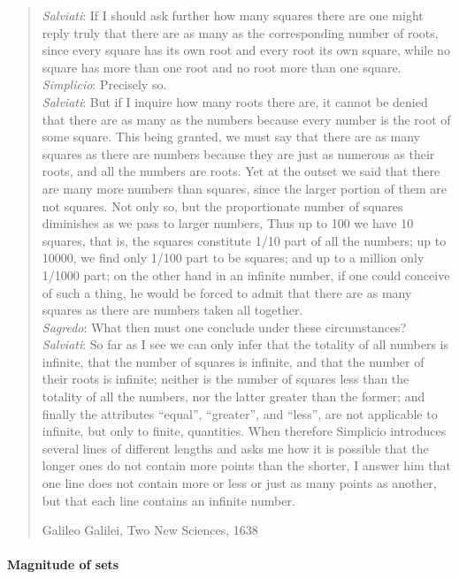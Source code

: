 \begin{quote}
	\textit{Salviati}: If I should ask further how many squares there are one might reply truly that there are as many as the corresponding number of roots, since every square has its own root and every root its own square, while no square has more than one root and no root more than one square.\\
	\textit{Simplicio}: Precisely so.\\
	\textit{Salviati}: But if I inquire how many roots there are, it cannot be denied that there are as many as the numbers because every number is the root of some square. This being granted, we must say that there are as many squares as there are numbers because they are just as numerous as their roots, and all the numbers are roots. Yet at the outset we said that there are many more numbers than squares, since the larger portion of them are not squares. Not only so, but the proportionate number of squares diminishes as we pass to larger numbers, Thus up to 100 we have 10 squares, that is, the squares constitute 1/10 part of all the numbers; up to 10000, we find only 1/100 part to be squares; and up to a million only 1/1000 part; on the other hand in an infinite number, if one could conceive of such a thing, he would be forced to admit that there are as many squares as there are numbers taken all together.\\
	\textit{Sagredo}: What then must one conclude under these circumstances?\\
	\textit{Salviati}: So far as I see we can only infer that the totality of all numbers is infinite, that the number of squares is infinite, and that the number of their roots is infinite; neither is the number of squares less than the totality of all the numbers, nor the latter greater than the former; and finally the attributes ``equal'', ``greater'', and ``less'', are not applicable to infinite, but only to finite, quantities. When therefore Simplicio introduces several lines of different lengths and asks me how it is possible that the longer ones do not contain more points than the shorter, I answer him that one line does not contain more or less or just as many points as another, but that each line contains an infinite number.
	\begin{flushright}
		{\footnotesize Galileo Galilei, Two New Sciences, 1638}
	\end{flushright}
\end{quote}

\paragraph{Magnitude of sets}

